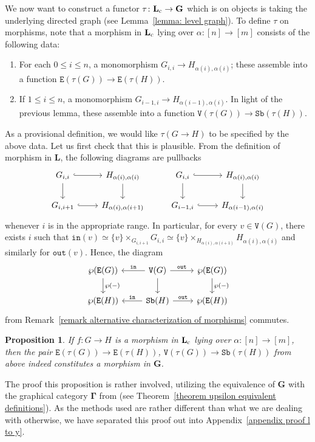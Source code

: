 \documentclass{amsart}
\numberwithin{theorem}{subsection}
\newtheorem{proposition}[theorem]{Proposition}
\theoremstyle{definition}
\newcommand{\name}[1]{\ensuremath{\text{\textup{#1}}}}
\newcommand{\levelg}{\mathbf{L}}
\newcommand{\levelgconn}{\levelg_{\name{c}}}
\newcommand{\bbY}{\mathbf{G}}
\newcommand{\hryGamma}{\mathbf{\Gamma}}
\newcommand{\sub}{\mathtt{Sb}}
\newcommand{\out}{\mathtt{out}}
\newcommand{\inp}{\mathtt{in}}
\newcommand{\edge}{\mathtt{E}}
\newcommand{\vertex}{\mathtt{V}}
\begin{document}
We now want to construct a functor $\tau\colon \levelgconn\to \bbY$ which is on objects is taking the underlying directed graph (see Lemma~\ref{lemma: level graph}).
To define $\tau$ on morphisms, note that a morphism in $\levelgconn$ lying over $\alpha: [n] \to [m]$ consists of the following data:
\begin{enumerate}
 	\item For each $0 \leq i \leq n$, a monomorphism $G_{i,i} \to H_{\alpha(i), \alpha(i)}$; these assemble into a function $\edge(\tau(G)) \to \edge(\tau(H))$.
 	\item If $1 \leq i \leq n$, a monomorphism $G_{i-1,i} \to  H_{\alpha(i-1), \alpha(i)}$.
In light of the previous lemma, these assemble into a function $\vertex(\tau(G)) \to \sub(\tau(H))$.
\end{enumerate}
As a provisional definition, we would like $\tau(G\to H)$ to be specified by the above data.
Let us first check that this is plausible.
From the definition of morphism in $\levelg$, the following diagrams are pullbacks
\[
\begin{tikzcd}
G_{i,i} \rar[hook] \dar & H_{\alpha(i),\alpha(i)} \dar & G_{i,i} \rar[hook] \dar & H_{\alpha(i),\alpha(i)} \dar \\
G_{i,i+1} \rar[hook] &  H_{\alpha(i),\alpha(i+1)} & G_{i-1,i} \rar[hook] &  H_{\alpha(i-1),\alpha(i)}
\end{tikzcd}
\]
whenever $i$ is in the appropriate range.
In particular, for every $v\in\vertex(G)$, there exists $i$ such that $\inp(v)\simeq \{v\}\times_{G_{i,i+1}} G_{i,i} \simeq \{v\}\times_{H_{\alpha(i),\alpha(i+1)}} H_{\alpha(i),\alpha(i)}$ and similarly for $\out(v)$. Hence, the diagram
\[
\begin{tikzcd}
\wp (\edge(G))  \dar["\wp(-)"] &\vertex(G)  \dar \lar["\inp" swap] \rar["\out"]& \wp (\edge(G))  \dar["\wp(-)"] \\
\wp (\edge(H))  & \sub(H) \lar["\inp" swap] \rar["\out"] & \wp (\edge(H))
\end{tikzcd}
\]
from Remark~\ref{remark alternative characterization of morphisms} commutes.

\begin{proposition}
\label{proposition functor l to y}
If $f\colon G\to H$ is a morphism in $\levelgconn$ lying over $\alpha\colon [n] \to [m]$, then the pair $\edge(\tau(G)) \to \edge(\tau(H))$, $\vertex(\tau(G)) \to \sub(\tau(H))$ from above indeed constitutes a morphism in $\bbY$.
\end{proposition}

The proof this proposition is rather involved, utilizing the equivalence of $\bbY$ with the graphical category $\hryGamma$ from \cite{hrybook} (see Theorem~\ref{theorem upsilon equivalent definitions}).
As the methods used are rather different than what we are dealing with otherwise, we have separated this proof out into Appendix~\ref{appendix proof l to y}.
\end{document}
